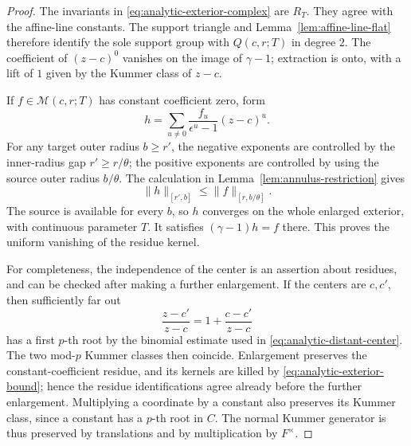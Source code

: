 \begin{proof}
The invariants in \eqref{eq:analytic-exterior-complex} are \(R_T\).
They agree with the affine-line constants.  The support triangle
and Lemma~\ref{lem:affine-line-flat} therefore identify the sole
support group with \(Q(c,r;T)\) in degree \(2\).
The coefficient of \((z-c)^0\) vanishes on the image of
\(\gamma-1\); extraction is onto, with a lift of \(1\) given by the
Kummer class of \(z-c\).

If \(f\in\mathcal M(c,r;T)\) has constant coefficient zero, form
\begin{equation}
 h=\sum_{u\neq0}
       \frac{f_u}{\epsilon^u-1}(z-c)^u.
 \label{eq:analytic-exterior-primitive}
\end{equation}
For any target outer radius \(b\geq r'\), the negative exponents
are controlled by the inner-radius gap \(r'\geq r/\theta\);
the positive exponents are controlled by using the source outer
radius \(b/\theta\).  The calculation in
Lemma~\ref{lem:annulus-restriction} gives
\begin{equation}
 \|h\|_{[r',b]}\leq \|f\|_{[r,b/\theta]}.
 \label{eq:analytic-exterior-bound}
\end{equation}
The source is available for every \(b\), so \(h\) converges on the
whole enlarged exterior, with continuous parameter \(T\).  It
satisfies \((\gamma-1)h=f\) there.  This proves the uniform
vanishing of the residue kernel.

For completeness, the independence of the center is an assertion
about residues, and can be checked after making a further
enlargement.  If the centers are \(c,c'\), then sufficiently far
out
\[
 \frac{z-c'}{z-c}=1+\frac{c-c'}{z-c}
\]
has a first \(p\)-th root by the binomial estimate used in
\eqref{eq:analytic-distant-center}.  The two mod-\(p\) Kummer classes
then coincide.  Enlargement preserves the constant-coefficient
residue, and its kernels are killed by
\eqref{eq:analytic-exterior-bound}; hence the residue
identifications agree already before the further enlargement.
Multiplying a coordinate by a constant also preserves its Kummer
class, since a constant has a \(p\)-th root in \(C\).  The normal
Kummer generator is thus preserved by translations and by
multiplication by \(F^\times\).
\end{proof}

